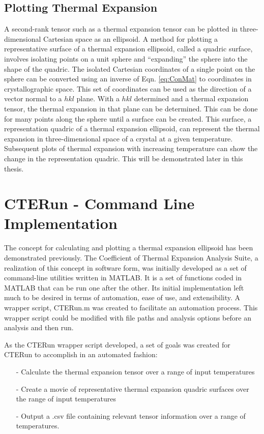 \subsection{Plotting Thermal Expansion}
A second-rank tensor such as a thermal expansion tensor can be plotted in three-dimensional Cartesian space as an ellipsoid.  A method for plotting a representative surface of a thermal expansion ellipsoid, called a quadric surface, involves isolating points on a unit sphere and ``expanding'' the sphere into the shape of the quadric.  The isolated Cartesian coordinates of a single point on the sphere can be converted using an inverse of Eqn. \ref{eq:ConMat} to coordinates in crystallographic space.  This set of coordinates can be used as the direction of a vector normal to a $hkl$ plane.  With a $hkl$ determined and a thermal expansion tensor, the thermal expansion in that plane can be determined.  This can be done for many points along the sphere until a surface can be created.  This surface, a representation quadric of a thermal expansion ellipsoid, can represent the thermal expansion in three-dimensional space of a crystal at a given temperature.  Subsequent plots of thermal expansion with increasing temperature can show the change in the representation quadric.  This will be demonstrated later in this thesis.

\section{CTERun - Command Line Implementation}
The concept for calculating and plotting a thermal expansion ellipsoid has been demonstrated previously.  The Coefficient of Thermal Expansion Analysis Suite, a realization of this concept in software form, was initially developed as a set of command-line utilities written in MATLAB.  It is a set of functions coded in MATLAB that can be run one after the other.  Its initial implementation left much to be desired in terms of automation, ease of use, and extensibility.  A wrapper script, CTERun.m was created to facilitate an automation process.  This wrapper script could be modified with file paths and analysis options before an analysis and then run.  

As the CTERun wrapper script developed, a set of goals was created for CTERun to accomplish in an automated fashion:
\begin{itemize}
 \item[-] Calculate the thermal expansion tensor over a range of input temperatures
 \item[-] Create a movie of representative thermal expansion quadric surfaces over the range of input temperatures
 \item[-] Output a .csv file containing relevant tensor information over a range of temperatures.
\end{itemize}


